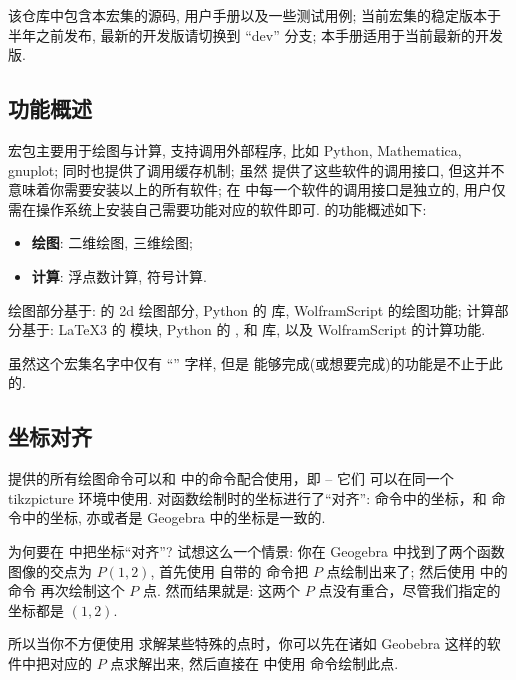 \documentclass[
  hyper, lang=cn, 
  class=l3dox, 
]{../../zlatex/code/ztex}
\begin{document}
\begin{center}
\end{center}

该仓库中包含本宏集的源码, 用户手册以及一些测试用例; 当前宏集的稳定版本于半年之前发布, 最新的开发版请切换到 ``dev'' 分支; 
本手册适用于当前最新的开发版.


\subsection{功能概述}
\zTikZ{} 宏包主要用于绘图与计算, 支持调用外部程序, 比如 Python, Mathematica, gnuplot; 同时也提供了调用缓存机制; 
虽然 \ztikz{} 提供了这些软件的调用接口, 但这并不意味着你需要安装以上的所有软件; 在 \ztikz{} 中每一个软件的调用接口是独立的, 
用户仅需在操作系统上安装自己需要功能对应的软件即可. \zTikZ{} 的功能概述如下: 
\begin{itemize}
  \item \textbf{绘图}: 二维绘图, 三维绘图;
  \item \textbf{计算}: 浮点数计算, 符号计算.
\end{itemize}

绘图部分基于: \TikZ{} 的 2d 绘图部分,%
Python 的  库, WolframScript 的绘图功能; 计算部分基于: \LaTeX3 的  模块, Python 
的 ,  和  库, 以及 WolframScript 的计算功能. 

虽然这个宏集名字中仅有 ``\TikZ{}'' 字样, 但是 \ztikz{} 能够完成(或想要完成)的功能是不止于此的.


\subsection{坐标对齐}
\zTikZ{} 提供的所有绘图命令可以和 \TikZ{} 中的命令配合使用，即 -- 它们
可以在同一个 {tikzpicture} 环境中使用. \zTikZ{} 对函数绘制时的坐标进行了``对齐'':
\zTikZ{} 命令中的坐标，和 \TikZ{} 命令中的坐标, 亦或者是 Geogebra 中的坐标是一致的. 

为何要在 \zTikZ{} 中把坐标``对齐''? 试想这么一个情景: 你在 Geogebra 中找到了两个函数图像的交点为 $P(1, 2)$,
首先使用 \TikZ{} 自带的 \cmd{\filldraw} 命令把 $P$ 点绘制出来了; 然后使用 \zTikZ{} 中的 \cmd{\ShowPoint} 命令
再次绘制这个 $P$ 点. 然而结果就是: 这两个 $P$ 点没有重合，尽管我们指定的坐标都是 $(1, 2)$.

所以当你不方便使用 \zTikZ{} 求解某些特殊的点时，你可以先在诸如 Geobebra 这样的软件中把对应的 $P$ 
点求解出来, 然后直接在 \zTikZ{} 中使用 \cmd{\ShowPoint} 命令绘制此点.
\end{document}
